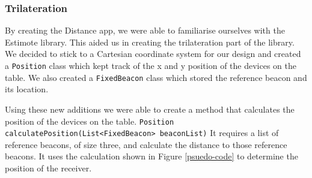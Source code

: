 \subsubsection{Trilateration} \label{nocamera_trilateration}

By creating the Distance app, we were able to familiarise ourselves with the Estimote library. This aided us in creating the trilateration part of the library. We decided to stick to a Cartesian coordinate system for our design and created a \lstinline|Position| class which kept track of the x and y position of the devices on the table. We also created a \lstinline|FixedBeacon| class which stored the reference beacon and its location.

Using these new additions we were able to create a method that calculates the position of the devices on the table. \lstinline|Position calculatePosition(List<FixedBeacon> beaconList)| It requires a list of reference beacons, of size three, and calculate the distance to those reference beacons. It uses the calculation shown in Figure \ref{psuedo-code} to determine the position of the receiver. 

